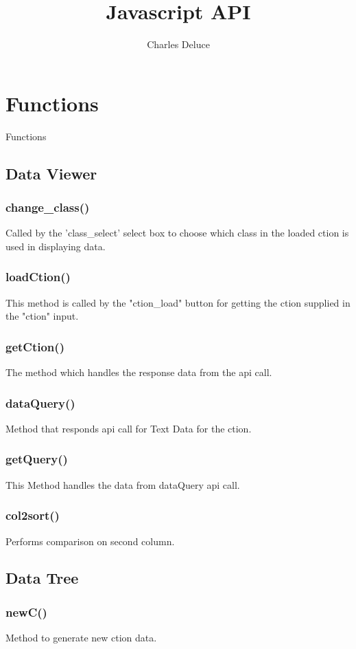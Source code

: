 \documentclass{article}
\title{Javascript API}
\author{Charles Deluce}
\begin{document}
\section{Functions}
Functions

\subsection{Data Viewer}

\subsubsection{change_class()}
Called by the 'class_select' select box to choose which 
class in the loaded ction is used in displaying data.

\subsubsection{loadCtion()}
This method is called by the "ction_load" button for getting 
the ction supplied in the "ction" input.

\subsubsection{getCtion()}
The method which handles the response data from the api call.

\subsubsection{dataQuery()}
Method that responds api call for Text Data for the ction.

\subsubsection{getQuery()}
This Method handles the data from dataQuery api call.

\subsubsection{col2sort()}
Performs comparison on second column.

\subsection{Data Tree}

\subsubsection{newC()}
Method to generate new ction data.
\end{document}
